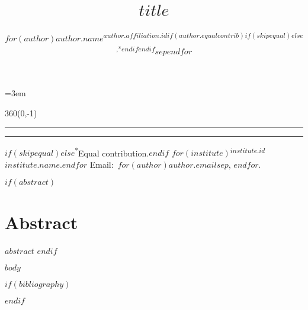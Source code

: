 \documentclass[letterpaper,12pt]{article}
\title{%
  \begin{minipage}{\textwidth}%
    \begin{flushleft}%
      {\normalfont\Huge $title$}%
    \end{flushleft}%
  \end{minipage}%
}
\author{%
  \begin{minipage}{\textwidth}%
    \begin{flushleft}%
      {%
        \normalfont\large\scshape%
        $for(author)$$author.name$\textsuperscript{$author.affiliation.id$$if(author.equalcontrib)$$if(skipequal)$$else$,*$endif$$endif$}$sep$\quad $endfor$%
      }%
    \end{flushleft}%
  \end{minipage}%
}
\date{}
\begin{document}
\maketitle
\thispagestyle{fancy}
\parindent=3em
\setnowidow[2]

\newlength{\lmargin}
\setlength{\lmargin}{\dimexpr(\paperwidth-\textwidth)/2\relax}

\textblockorigin{\lmargin}{\paperheight}
\setlength{\TPHorizModule}{1pt}
\setlength{\TPVertModule}{1in}
\begin{textblock}{360}(0,-1)
    \parindent=0pt
    \normalfont\scriptsize\raggedright

    \hrule
    \hrule
    \vspace{1.5ex}

    $if(skipequal)$$else$\textsuperscript{*}Equal contribution.$endif$
    $for(institute)$\textsuperscript{$institute.id$}$institute.name$.$endfor$
    Email:~$for(author)$\texttt{$author.email$}$sep$, $endfor$.
\end{textblock}

$if(abstract)$
\section*{Abstract}
$abstract$
$endif$

$body$

$if(bibliography)$
\footnotesize


$endif$
\end{document}
